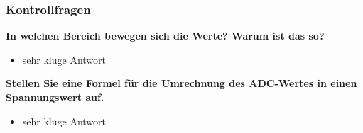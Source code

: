 \documentclass{article}
\begin{document}
\subsubsection{Kontrollfragen}

\textbf{In welchen Bereich bewegen sich die Werte? Warum ist das so?}
\begin{itemize}
    \item sehr kluge Antwort
\end{itemize}
\textbf{Stellen Sie eine Formel für die Umrechnung des ADC-Wertes in einen Spannungswert auf.}
\begin{itemize}
    \item sehr kluge Antwort
\end{itemize}


\newpage
\listoffigures

\listoftables
\end{document}
